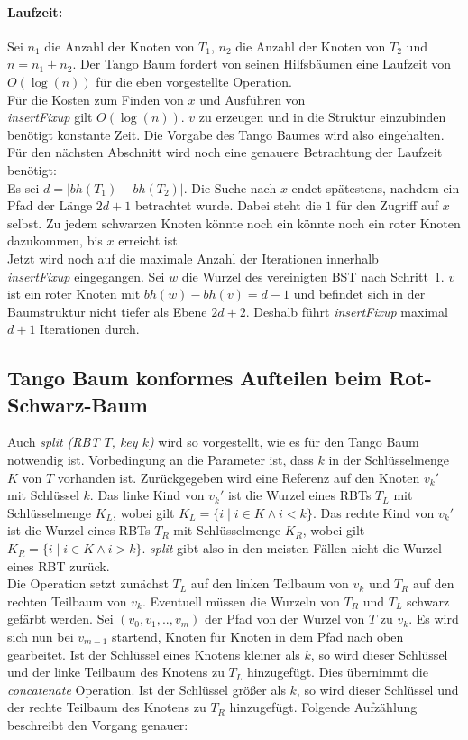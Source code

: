 \documentclass[a4paper,12pt]{article}
\begin{document}
\paragraph{Laufzeit:}
Sei $n_1$ die Anzahl der Knoten von $T_1$, $n_2$ die Anzahl der Knoten von $T_2$ und $n = n_1 + n_2$. Der Tango Baum fordert von seinen Hilfsbäumen eine Laufzeit von $O(\log \left(n\right))$ für die eben vorgestellte Operation.\\ Für die Kosten zum Finden von $x$ und Ausführen von \\ \textit{insertFixup}  gilt $O(\log (n))$. $v$ zu erzeugen und in die Struktur einzubinden benötigt konstante Zeit. 
Die Vorgabe des Tango Baumes wird also eingehalten.\\
Für den nächsten Abschnitt wird noch eine genauere Betrachtung der Laufzeit benötigt:\\ Es sei $d = \vert \mathit{bh}(T_1) - \mathit{bh}(T_2)  \vert $. Die Suche nach $x$ endet spätestens, nachdem ein Pfad der Länge $2d + 1$ betrachtet wurde. Dabei steht die $1$ für den Zugriff auf $x$ selbst. Zu jedem schwarzen Knoten könnte noch ein könnte noch ein roter Knoten dazukommen, bis $x$ erreicht ist\\
 Jetzt wird noch auf die maximale Anzahl der Iterationen innerhalb \\ \textit{insertFixup} eingegangen.
 Sei $w$ die Wurzel des vereinigten BST nach \mbox{Schritt 1}. $v$ ist ein roter Knoten mit $\mathit{bh}(w) - \mathit{bh}(v) = d - 1$ und befindet sich in der Baumstruktur nicht tiefer als Ebene $2d + 2$. Deshalb führt \textit{insertFixup} maximal $d + 1$ Iterationen durch.  

\subsection{Tango Baum konformes Aufteilen beim Rot-Schwarz-Baum}
Auch \textit{split (RBT $T$, key $k$)} wird so vorgestellt, wie es für den Tango Baum notwendig ist. Vorbedingung an die Parameter ist, dass $k$ in der Schlüsselmenge $K$ von $T$ vorhanden ist. Zurückgegeben wird eine Referenz auf den Knoten ${v_k}'$ mit Schlüssel $k$. Das linke Kind von ${v_k}'$ ist die Wurzel eines RBTs $T_L$ mit Schlüsselmenge $K_L$, wobei gilt ${K_L=\{i \mid  i\in K \land i <k\}}$. Das rechte Kind von ${v_k}'$ ist die Wurzel eines RBTs $T_R$ mit Schlüsselmenge $K_R$, wobei gilt ${K_R = \{i \mid i\in K \land i > k\}}$. \textit{split} gibt also in den meisten Fällen nicht die Wurzel eines RBT zurück.\\ Die Operation setzt zunächst $T_L$ auf den linken Teilbaum von $v_k$ und $T_R$ auf den rechten Teilbaum von $v_k$. Eventuell müssen die Wurzeln von $T_R$ und $T_L$ schwarz gefärbt werden. Sei $(v_0,v_1,..,v_m)$  der Pfad von der Wurzel von $T$ zu $v_k$. Es wird sich nun bei $v_{m-1}$ startend, Knoten für Knoten in dem Pfad nach oben gearbeitet. Ist der Schlüssel eines Knotens kleiner als $k$, so wird dieser Schlüssel und der linke Teilbaum des Knotens zu $T_L$ hinzugefügt. Dies übernimmt die \textit{concatenate} Operation. Ist der Schlüssel größer als $k$, so wird dieser Schlüssel und der rechte Teilbaum des Knotens zu $T_R$ hinzugefügt. Folgende Aufzählung beschreibt den Vorgang genauer:
\end{document}

